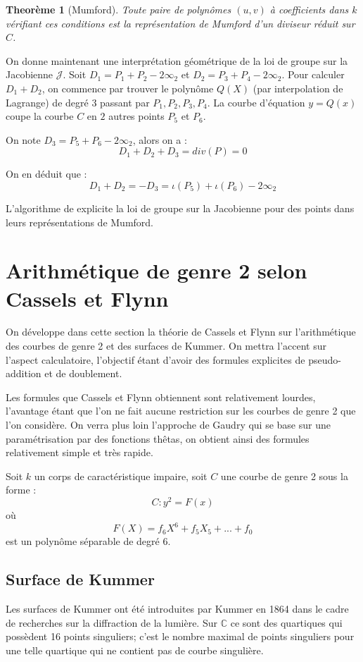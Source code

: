 \documentclass[a4paper,12pt]{article}
\newtheorem{theoreme}{Theorème}[section]
\theoremstyle{definition}
\theoremstyle{remark}
\numberwithin{equation}{section}
\begin{document}
\begin{theoreme}[Mumford]
Toute paire de polynômes $(u,v)$ à coefficients dans $k$ vérifiant ces conditions est la représentation de Mumford d'un diviseur réduit sur $C$.
\end{theoreme}

On donne maintenant une interprétation géométrique de la loi de groupe sur la Jacobienne $\mathcal{J}$. Soit $D_1 = P_1 + P_2 - 2\infty_2$ et $D_2 = P_3 + P_4 - 2\infty_2$. Pour calculer $D_1 + D_2$, on commence par trouver le polynôme $Q(X)$ (par interpolation de Lagrange) de degré $3$ passant par $P_1,P_2,P_3,P_4$. La courbe d'équation $y = Q(x)$ coupe la courbe $C$ en $2$ autres points $P_5$ et $P_6$.

On note $D_3 = P_5 + P_6 - 2\infty_2$, alors on a :
$$D_1 + D_2 + D_3 = div(P) = 0$$

On en déduit que :
$$D_1 + D_2 = -D_3 = \iota(P_5) + \iota(P_6) - 2\infty_2$$

L'algorithme de \citet{cantor} explicite la loi de groupe sur la Jacobienne pour des points dans leurs représentations de Mumford.

\section{Arithmétique de genre 2 selon Cassels et Flynn}
On développe dans cette section la théorie de Cassels et Flynn sur l'arithmétique des courbes de genre 2 et des surfaces de Kummer. On mettra l'accent sur l'aspect calculatoire, l'objectif étant d'avoir des formules explicites de pseudo-addition et de doublement.

Les formules que Cassels et Flynn obtiennent sont relativement lourdes, l'avantage étant que l'on ne fait aucune restriction sur les courbes de genre 2 que l'on considère. On verra plus loin l'approche de Gaudry qui se base sur une paramétrisation par des fonctions thêtas, on obtient ainsi des formules relativement simple et très rapide.

Soit $k$ un corps de caractéristique impaire, soit $C$ une courbe de genre 2 sous la forme :
$$C : y^2 = F(x)$$
où $$F(X) = f_6X^6 + f_5X_5 + ... + f_0$$ est un polynôme séparable de degré 6.

\subsection{Surface de Kummer}
Les surfaces de Kummer ont été introduites par Kummer en 1864 dans le cadre de recherches sur la diffraction de la lumière. Sur $\mathbb{C}$ ce sont des quartiques qui possèdent 16 points singuliers; c'est le nombre maximal de points singuliers pour une telle quartique qui ne contient pas de courbe singulière.
\end{document}
